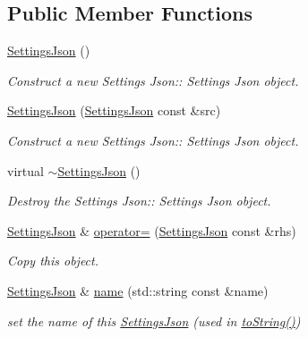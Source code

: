 \subsection*{Public Member Functions}
\begin{DoxyCompactItemize}
\item 
\mbox{\label{class_settings_json_aae5ffef6e0c1883cd8b5a150b891b172}} 
\hyperlink{class_settings_json_aae5ffef6e0c1883cd8b5a150b891b172}{Settings\+Json} ()
\begin{DoxyCompactList}\small\item\em Construct a new Settings Json\+:\+: Settings Json object. \end{DoxyCompactList}\item 
\hyperlink{class_settings_json_a449a6c3026583d1ee209e6086f663996}{Settings\+Json} (\hyperlink{class_settings_json}{Settings\+Json} const \&src)
\begin{DoxyCompactList}\small\item\em Construct a new Settings Json\+:\+: Settings Json object. \end{DoxyCompactList}\item 
\mbox{\label{class_settings_json_aa18439510f260bb2b011c2c1f431d97c}} 
virtual \hyperlink{class_settings_json_aa18439510f260bb2b011c2c1f431d97c}{$\sim$\+Settings\+Json} ()
\begin{DoxyCompactList}\small\item\em Destroy the Settings Json\+:\+: Settings Json object. \end{DoxyCompactList}\item 
\hyperlink{class_settings_json}{Settings\+Json} \& \hyperlink{class_settings_json_aeacbc8e4b3c2ada35b2303d0ae1bf4b9}{operator=} (\hyperlink{class_settings_json}{Settings\+Json} const \&rhs)
\begin{DoxyCompactList}\small\item\em Copy this object. \end{DoxyCompactList}\item 
\hyperlink{class_settings_json}{Settings\+Json} \& \hyperlink{class_settings_json_a301eda8c47d1140298fade3907c723d6}{name} (std\+::string const \&name)
\begin{DoxyCompactList}\small\item\em set the name of this \hyperlink{class_settings_json}{Settings\+Json} (used in \hyperlink{class_settings_json_adf9b6991ed9896cc90455a016b5a9f29}{to\+String()}) \end{DoxyCompactList}\item 

\end{DoxyCompactItemize}
